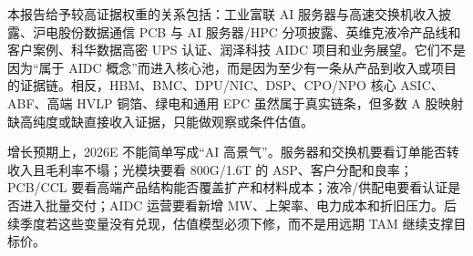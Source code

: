 本报告给予较高证据权重的关系包括：工业富联 AI 服务器与高速交换机收入披露、沪电股份数据通信 PCB 与 AI 服务器/HPC 分项披露、英维克液冷产品线和客户案例、科华数据高密 UPS 认证、润泽科技 AIDC 项目和业务展望。它们不是因为“属于 AIDC 概念”而进入核心池，而是因为至少有一条从产品到收入或项目的证据链。相反，HBM、BMC、DPU/NIC、DSP、CPO/NPO 核心 ASIC、ABF、高端 HVLP 铜箔、绿电和通用 EPC 虽然属于真实链条，但多数 A 股映射缺高纯度或缺直接收入证据，只能做观察或条件估值。

增长预期上，2026E 不能简单写成“AI 高景气”。服务器和交换机要看订单能否转收入且毛利率不塌；光模块要看 800G/1.6T 的 ASP、客户分配和良率；PCB/CCL 要看高端产品结构能否覆盖扩产和材料成本；液冷/供配电要看认证是否进入批量交付；AIDC 运营要看新增 MW、上架率、电力成本和折旧压力。后续季度若这些变量没有兑现，估值模型必须下修，而不是用远期 TAM 继续支撑目标价。
